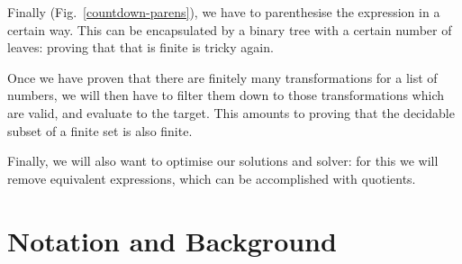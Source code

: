 Finally (Fig.~\ref{countdown-parens}), we have to parenthesise the expression in
a certain way.
This can be encapsulated by a binary tree with a certain number of leaves:
proving that that is finite is tricky again.

Once we have proven that there are finitely many transformations for a list of
numbers, we will then have to filter them down to those transformations which
are valid, and evaluate to the target.
This amounts to proving that the decidable subset of a finite set is also
finite.

Finally, we will also want to optimise our solutions and solver: for this we
will remove equivalent expressions, which can be accomplished with quotients.
\section{Notation and Background}
